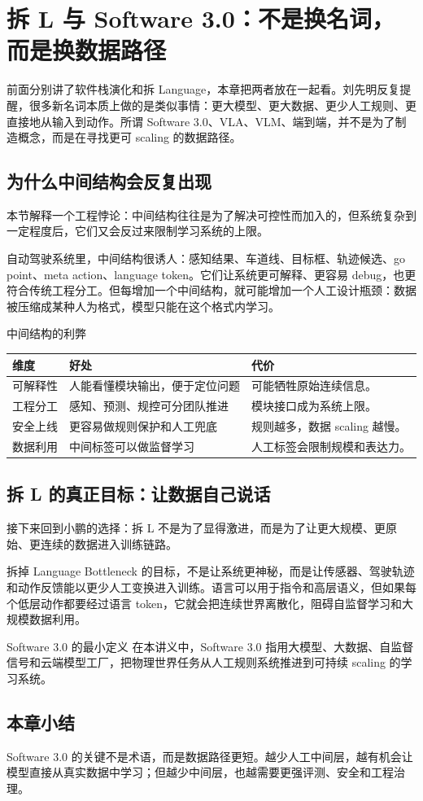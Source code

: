 \section{拆 L 与 Software 3.0：不是换名词，而是换数据路径}

前面分别讲了软件栈演化和拆 Language，本章把两者放在一起看。刘先明反复提醒，很多新名词本质上做的是类似事情：更大模型、更大数据、更少人工规则、更直接地从输入到动作。所谓 Software 3.0、VLA、VLM、端到端，并不是为了制造概念，而是在寻找更可 scaling 的数据路径。

\subsection{为什么中间结构会反复出现}

本节解释一个工程悖论：中间结构往往是为了解决可控性而加入的，但系统复杂到一定程度后，它们又会反过来限制学习系统的上限。

自动驾驶系统里，中间结构很诱人：感知结果、车道线、目标框、轨迹候选、go point、meta action、language token。它们让系统更可解释、更容易 debug，也更符合传统工程分工。但每增加一个中间结构，就可能增加一个人工设计瓶颈：数据被压缩成某种人为格式，模型只能在这个格式内学习。

\begin{knowledgebox}{中间结构的利弊}
\begin{tabularx}{\textwidth}{p{}p{}X}
\toprule
维度 & 好处 & 代价 \\
\midrule
可解释性 & 人能看懂模块输出，便于定位问题 & 可能牺牲原始连续信息。 \\
工程分工 & 感知、预测、规控可分团队推进 & 模块接口成为系统上限。 \\
安全上线 & 更容易做规则保护和人工兜底 & 规则越多，数据 scaling 越慢。 \\
数据利用 & 中间标签可以做监督学习 & 人工标签会限制规模和表达力。 \\
\bottomrule
\end{tabularx}
\end{knowledgebox}

\subsection{拆 L 的真正目标：让数据自己说话}

接下来回到小鹏的选择：拆 L 不是为了显得激进，而是为了让更大规模、更原始、更连续的数据进入训练链路。

拆掉 Language Bottleneck 的目标，不是让系统更神秘，而是让传感器、驾驶轨迹和动作反馈能以更少人工变换进入训练。语言可以用于指令和高层语义，但如果每个低层动作都要经过语言 token，它就会把连续世界离散化，阻碍自监督学习和大规模数据利用。

\begin{importantbox}{Software 3.0 的最小定义}
在本讲义中，Software 3.0 指用大模型、大数据、自监督信号和云端模型工厂，把物理世界任务从人工规则系统推进到可持续 scaling 的学习系统。
\end{importantbox}

\subsection{本章小结}

Software 3.0 的关键不是术语，而是数据路径更短。越少人工中间层，越有机会让模型直接从真实数据中学习；但越少中间层，也越需要更强评测、安全和工程治理。

